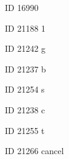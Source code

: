 \documentclass{article}
\begin{document}
\Huge

ID 16990   {\unifont{}}

ID 21188 1  {\unifont{}}

ID 21242 g {\unifont{}}

ID 21237 b {\unifont{}}

ID 21254 s {\unifont{}}

ID 21238 c {\unifont{}}

ID 21255 t {\unifont{}}

ID 21266 cancel {\unifont{}}
\end{document}
